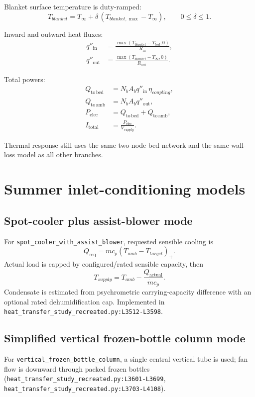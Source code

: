\documentclass[11pt]{article}
\newcommand{\srcref}[1]{\nolinkurl{#1}}
\newcommand{\code}[1]{\nolinkurl{#1}}
\begin{document}
Blanket surface temperature is duty-ramped:
\begin{equation}
T_{blanket} = T_\infty + \delta\,(T_{blanket,\max}-T_\infty), \qquad 0\le\delta\le 1.
\end{equation}

Inward and outward heat fluxes:
\begin{align}
q''_{\mathrm{in}} &= \frac{\max(T_{blanket}-T_{bed},0)}{R_{\mathrm{in}}}, \\
q''_{\mathrm{out}} &= \frac{\max(T_{blanket}-T_\infty,0)}{R_{\mathrm{out}}}.
\end{align}

Total powers:
\begin{align}
Q_{\mathrm{to\,bed}} &= N_b A_b q''_{\mathrm{in}}\,\eta_{coupling}, \\
Q_{\mathrm{to\,amb}} &= N_b A_b q''_{\mathrm{out}}, \\
P_{\mathrm{elec}} &= Q_{\mathrm{to\,bed}} + Q_{\mathrm{to\,amb}}, \\
I_{\mathrm{total}} &= \frac{P_{\mathrm{elec}}}{V_{supply}}.
\end{align}

Thermal response still uses the same two-node bed network and the same wall-loss
model as all other branches.

\section{Summer inlet-conditioning models}
\subsection{Spot-cooler plus assist-blower mode}
For \code{spot\_cooler\_with\_assist\_blower}, requested sensible cooling is
\begin{equation}
Q_{\mathrm{req}} = \dot m c_p (T_{amb}-T_{target})_+.
\end{equation}
Actual load is capped by configured/rated sensible capacity, then
\begin{equation}
T_{supply} = T_{amb} - \frac{Q_{\mathrm{actual}}}{\dot m c_p}.
\end{equation}
Condensate is estimated from psychrometric carrying-capacity difference with an
optional rated dehumidification cap. Implemented in
\srcref{heat_transfer_study_recreated.py:L3512-L3598}.

\subsection{Simplified vertical frozen-bottle column mode}
For \code{vertical\_frozen\_bottle\_column}, a single central vertical tube is
used; fan flow is downward through packed frozen bottles
(\srcref{heat_transfer_study_recreated.py:L3601-L3699},
\srcref{heat_transfer_study_recreated.py:L3703-L4108}).
\end{document}
